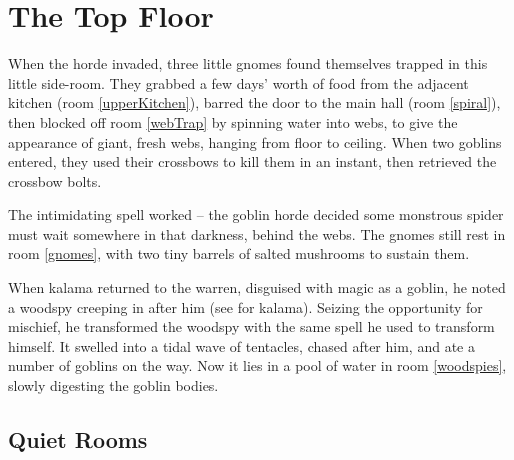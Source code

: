 \chapter{The Top Floor}
\epigraph{
  \iftoggle{hardcore}{
    I have township, yet no houses.
    Forests, but no trees.
    Rivers, but no water.
  }{
    Never resting, never still.

    Moving silently from hill to hill.

    It does not walk, run or trot.

    All is cool where it is not.
  }
}{}

\glsresetall

\noindent
\begin{exampletext}
  When the horde invaded, three little gnomes found themselves trapped in this little side-room.
  They grabbed a few days' worth of food from the adjacent kitchen (room \ref{upperKitchen}),
  barred the door to the main hall (room \ref{spiral}), then blocked off room \ref{webTrap} by spinning water into webs, to give the appearance of giant, fresh webs, hanging from floor to ceiling.
  When two goblins entered, they used their crossbows to kill them in an instant, then retrieved the crossbow bolts.

  The intimidating spell worked -- the goblin horde decided some monstrous spider must wait somewhere in that darkness, behind the webs.
  The gnomes still rest in room \vref{gnomes}, with two tiny barrels of salted mushrooms to sustain them.

  When \gls{kalama}%
  returned to the \gls{warren}, disguised with magic as a goblin, he noted a woodspy%
  creeping in after him
  (see  for \gls{kalama}).
  Seizing the opportunity for mischief, he transformed the woodspy with the same spell he used to transform himself.
  It swelled into a tidal wave of tentacles, chased after him, and ate a number of goblins on the way.
  Now it lies in a pool of water in room \ref{woodspies}, slowly digesting the goblin bodies.
\end{exampletext}

\section{Quiet Rooms}
\label{upper}

